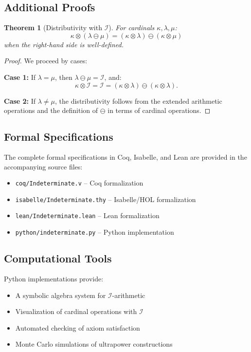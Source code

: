 \documentclass[12pt,a4paper]{article}
\newtheorem{theorem}{Theorem}[section]
\theoremstyle{definition}
\theoremstyle{remark}
\begin{document}
\subsection{Additional Proofs}

\begin{theorem}[Distributivity with $\mathcal{I}$]
For cardinals $\kappa, \lambda, \mu$:
\[
\kappa \otimes (\lambda \ominus \mu) = (\kappa \otimes \lambda) \ominus (\kappa \otimes \mu)
\]
when the right-hand side is well-defined.
\end{theorem}

\begin{proof}
We proceed by cases:

\textbf{Case 1:} If $\lambda = \mu$, then $\lambda \ominus \mu = \mathcal{I}$, and:
\[
\kappa \otimes \mathcal{I} = \mathcal{I} = (\kappa \otimes \lambda) \ominus (\kappa \otimes \lambda).
\]

\textbf{Case 2:} If $\lambda \neq \mu$, the distributivity follows from the extended arithmetic operations and the definition of $\ominus$ in terms of cardinal operations.
\end{proof}

\subsection{Formal Specifications}

The complete formal specifications in Coq, Isabelle, and Lean are provided in the accompanying source files:
\begin{itemize}
\item \texttt{coq/Indeterminate.v} -- Coq formalization
\item \texttt{isabelle/Indeterminate.thy} -- Isabelle/HOL formalization
\item \texttt{lean/Indeterminate.lean} -- Lean formalization
\item \texttt{python/indeterminate.py} -- Python implementation
\end{itemize}

\subsection{Computational Tools}

Python implementations provide:
\begin{itemize}
\item A symbolic algebra system for $\mathcal{I}$-arithmetic
\item Visualization of cardinal operations with $\mathcal{I}$
\item Automated checking of axiom satisfaction
\item Monte Carlo simulations of ultrapower constructions
\end{itemize}
\end{document}
